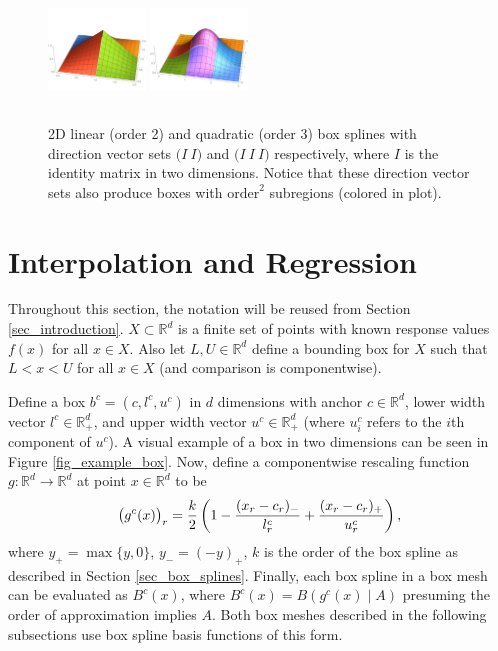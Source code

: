 \begin{figure}
  \vspace{-.5cm}
  \includegraphics[width=0.23\textwidth,height=3cm]{2D-linear.pdf}
  \includegraphics[width=0.23\textwidth,height=3cm]{2D-quadratic.pdf}
  \caption{2D linear (order 2) and quadratic (order 3) box splines with direction vector sets $\bigl( I \ I \bigr)$ and $\bigl( I \ I \ I \bigr)$ respectively, where $I$ is the identity matrix in two dimensions. Notice that these direction vector sets also produce boxes with $\text{order}^2$ subregions (colored in plot).
  \vspace{-0.1cm}}
  \label{fig_2D_boxes}
\end{figure}

\section{Interpolation and Regression}
\label{sec_mesh_construction}

Throughout this section, the notation will be reused from Section \ref{sec_introduction}. $X \subset \mathbb{R}^d$ is a finite set of points with known response values $f(x)$ for all $x \in X$. Also let $L,U \in \mathbb{R}^d$ define a bounding box for $X$ such that $L < x < U$ for all $x \in X$ (and comparison is componentwise).

Define a box $b^c = (c,l^c,u^c)$ in $d$ dimensions with anchor $c \in \mathbb{R}^d$, lower width vector $l^c \in \mathbb{R}^d_+$, and upper width vector $u^c \in \mathbb{R}^d_+$ (where $u^c_i$ refers to the $i$th component of $u^c$). A visual example of a box in two dimensions can be seen in Figure \ref{fig_example_box}. Now, define a componentwise rescaling function $g: \mathbb{R}^d \rightarrow \mathbb{R}^d$ at point $x \in \mathbb{R}^d$ to be
\begin{equation}
  \bigl(g^c(x)\bigr)_r = {k \over 2} \left( 1 - {(x_r - c_r)_- \over l^c_r} + {(x_r - c_r)_+ \over u^c_r} \right),
\end{equation}
where $y_+=\max\{y,0\}$, $y_-=(-y)_+$, $k$ is the order of the box spline as described in Section \ref{sec_box_splines}. Finally, each box spline in a box mesh can be evaluated as $B^c(x)$, where $B^c(x) = B(g^c(x) \mid A)$ presuming the order of approximation implies $A$. Both box meshes described in the following subsections use box spline basis functions of this form.

